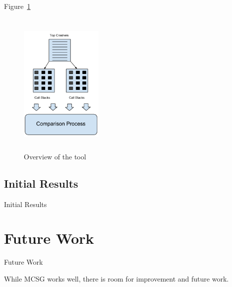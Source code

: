 \documentclass{sig-alternate}
\begin{document}
%	
 



Figure~\ref{fig:toolstructure}
\begin{figure}[thb!]
\centering
\includegraphics[width=40mm,height=70mm]{images/crashgroupingtool.png}
\caption{Overview of the tool}
\label{fig:toolstructure}
\end{figure}


\subsection{Initial Results}
Initial Results



\section{Future Work}
\label{sec: futurework}
Future Work

While MCSG works well, there is room for improvement and future work.


% 
\end{document}
